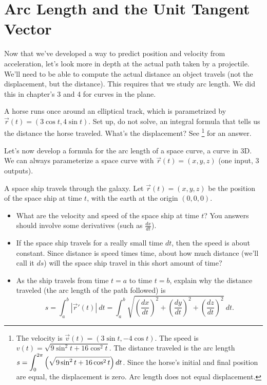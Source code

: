 \section{Arc Length and the Unit Tangent Vector}
Now that we've developed a way to predict position and velocity from acceleration, let's look more in depth at the actual path taken by a projectile. We'll need to be able to compute the actual distance an object travels (not the displacement, but the distance).  This requires that we study arc length.  We did this in chapter's 3 and 4 for curves in the plane.

\begin{review*}
 A horse runs once around an elliptical track, which is parametrized by $\vec r(t) = (3\cos t,4\sin t)$.  Set up, do not solve, an integral formula that tells us the distance the horse traveled. What's the displacement? See 
\footnote{The velocity is $\vec v(t) = (3\sin t, -4\cos t)$. The speed is $v(t) = \sqrt{9\sin^2t+16\cos^2t}$. The distance traveled is the arc length $\displaystyle s=\int_0^{2\pi} \left(\sqrt{9\sin^2t+16\cos^2t}\right)dt$. Since the horse's initial and final position are equal, the displacement is zero. Arc length does not equal displacement. }
for an answer.
\end{review*}
 

Let's now develop a formula for the arc length of a space curve, a curve in 3D. We can always parameterize a space curve with $\vec r(t) = (x,y,z)$ (one input, 3 outputs).

\begin{problem}
A space ship travels through the galaxy. Let $\vec r(t) = (x,y,z)$ 
%
be the position of the space ship at time $t$, with the earth at the origin $(0,0,0)$. 
\begin{itemize}
 \item What are the velocity and speed of the space ship at time $t$? You answers should involve some derivatives (such as $\frac{dx}{dt}$).
 \item If the space ship travels for a really small time $dt$, then the speed is about constant. Since distance is speed times time, about how much distance (we'll call it $ds$) will the space ship travel in this short amount of time?
 \item As the ship travels from time $t=a$ to time $t=b$, explain why the distance traveled (the arc length of the path followed) is $$s=\int_a^b |\vec r '(t)|\ dt = \int_a^b \sqrt{\left(\frac{dx}{dt}\right)^2+\left(\frac{dy}{dt}\right)^2+\left(\frac{dz}{dt}\right)^2}\ dt .$$
\end{itemize}

\end{problem}

